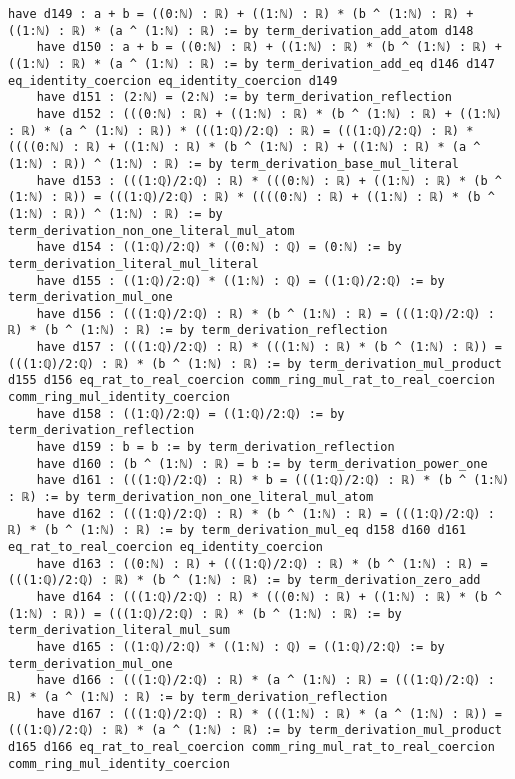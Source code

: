 \documentclass{article}
\begin{document}
\begin{tcolorbox}[colback=white!10, width=\linewidth]
\begin{lstlisting}[language=Lean4]
    have d149 : a + b = ((0:ℕ) : ℝ) + ((1:ℕ) : ℝ) * (b ^ (1:ℕ) : ℝ) + ((1:ℕ) : ℝ) * (a ^ (1:ℕ) : ℝ) := by term_derivation_add_atom d148
    have d150 : a + b = ((0:ℕ) : ℝ) + ((1:ℕ) : ℝ) * (b ^ (1:ℕ) : ℝ) + ((1:ℕ) : ℝ) * (a ^ (1:ℕ) : ℝ) := by term_derivation_add_eq d146 d147 eq_identity_coercion eq_identity_coercion d149
    have d151 : (2:ℕ) = (2:ℕ) := by term_derivation_reflection
    have d152 : (((0:ℕ) : ℝ) + ((1:ℕ) : ℝ) * (b ^ (1:ℕ) : ℝ) + ((1:ℕ) : ℝ) * (a ^ (1:ℕ) : ℝ)) * (((1:ℚ)/2:ℚ) : ℝ) = (((1:ℚ)/2:ℚ) : ℝ) * ((((0:ℕ) : ℝ) + ((1:ℕ) : ℝ) * (b ^ (1:ℕ) : ℝ) + ((1:ℕ) : ℝ) * (a ^ (1:ℕ) : ℝ)) ^ (1:ℕ) : ℝ) := by term_derivation_base_mul_literal
    have d153 : (((1:ℚ)/2:ℚ) : ℝ) * (((0:ℕ) : ℝ) + ((1:ℕ) : ℝ) * (b ^ (1:ℕ) : ℝ)) = (((1:ℚ)/2:ℚ) : ℝ) * ((((0:ℕ) : ℝ) + ((1:ℕ) : ℝ) * (b ^ (1:ℕ) : ℝ)) ^ (1:ℕ) : ℝ) := by term_derivation_non_one_literal_mul_atom
    have d154 : ((1:ℚ)/2:ℚ) * ((0:ℕ) : ℚ) = (0:ℕ) := by term_derivation_literal_mul_literal
    have d155 : ((1:ℚ)/2:ℚ) * ((1:ℕ) : ℚ) = ((1:ℚ)/2:ℚ) := by term_derivation_mul_one
    have d156 : (((1:ℚ)/2:ℚ) : ℝ) * (b ^ (1:ℕ) : ℝ) = (((1:ℚ)/2:ℚ) : ℝ) * (b ^ (1:ℕ) : ℝ) := by term_derivation_reflection
    have d157 : (((1:ℚ)/2:ℚ) : ℝ) * (((1:ℕ) : ℝ) * (b ^ (1:ℕ) : ℝ)) = (((1:ℚ)/2:ℚ) : ℝ) * (b ^ (1:ℕ) : ℝ) := by term_derivation_mul_product d155 d156 eq_rat_to_real_coercion comm_ring_mul_rat_to_real_coercion comm_ring_mul_identity_coercion
    have d158 : ((1:ℚ)/2:ℚ) = ((1:ℚ)/2:ℚ) := by term_derivation_reflection
    have d159 : b = b := by term_derivation_reflection
    have d160 : (b ^ (1:ℕ) : ℝ) = b := by term_derivation_power_one
    have d161 : (((1:ℚ)/2:ℚ) : ℝ) * b = (((1:ℚ)/2:ℚ) : ℝ) * (b ^ (1:ℕ) : ℝ) := by term_derivation_non_one_literal_mul_atom
    have d162 : (((1:ℚ)/2:ℚ) : ℝ) * (b ^ (1:ℕ) : ℝ) = (((1:ℚ)/2:ℚ) : ℝ) * (b ^ (1:ℕ) : ℝ) := by term_derivation_mul_eq d158 d160 d161 eq_rat_to_real_coercion eq_identity_coercion
    have d163 : ((0:ℕ) : ℝ) + (((1:ℚ)/2:ℚ) : ℝ) * (b ^ (1:ℕ) : ℝ) = (((1:ℚ)/2:ℚ) : ℝ) * (b ^ (1:ℕ) : ℝ) := by term_derivation_zero_add
    have d164 : (((1:ℚ)/2:ℚ) : ℝ) * (((0:ℕ) : ℝ) + ((1:ℕ) : ℝ) * (b ^ (1:ℕ) : ℝ)) = (((1:ℚ)/2:ℚ) : ℝ) * (b ^ (1:ℕ) : ℝ) := by term_derivation_literal_mul_sum
    have d165 : ((1:ℚ)/2:ℚ) * ((1:ℕ) : ℚ) = ((1:ℚ)/2:ℚ) := by term_derivation_mul_one
    have d166 : (((1:ℚ)/2:ℚ) : ℝ) * (a ^ (1:ℕ) : ℝ) = (((1:ℚ)/2:ℚ) : ℝ) * (a ^ (1:ℕ) : ℝ) := by term_derivation_reflection
    have d167 : (((1:ℚ)/2:ℚ) : ℝ) * (((1:ℕ) : ℝ) * (a ^ (1:ℕ) : ℝ)) = (((1:ℚ)/2:ℚ) : ℝ) * (a ^ (1:ℕ) : ℝ) := by term_derivation_mul_product d165 d166 eq_rat_to_real_coercion comm_ring_mul_rat_to_real_coercion comm_ring_mul_identity_coercion

\end{lstlisting}
\end{tcolorbox}
\end{document}
